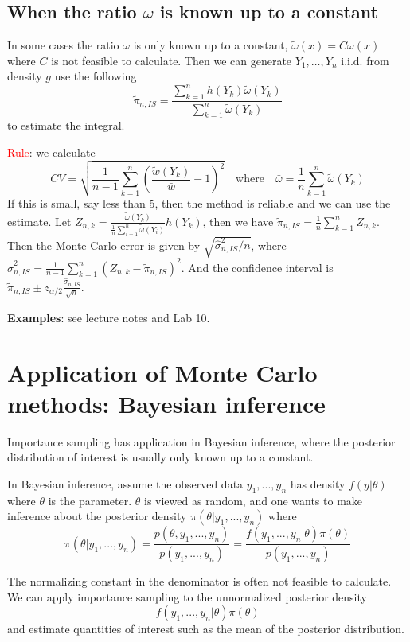 \documentclass[12pt]{article}
\begin{document}
\subsection*{When the ratio $\omega$ is known up to a constant}
In some cases the ratio $\omega$ is only known up to a constant, $\tilde{\omega}(x)=C\omega(x)$ where $C$ is not feasible to calculate. Then we can generate $Y_1,\ldots,Y_n$ i.i.d. from density $g$ use the following $$\tilde{\pi}_{n,IS}=\frac{\sum_{k=1}^n{h(Y_k)\tilde{\omega}(Y_k)}}{\sum_{k=1}^n{\tilde{\omega}(Y_k)}}$$ to estimate the integral.

\vspace{0.5cm}

\textcolor{red}{Rule}: we calculate $$ CV = \sqrt{\frac{1}{n-1} \sum_{k=1}^n \left(\frac{\tilde{w}(Y_k)}{\bar{w} } -1\right)^2}  \quad \mathrm{where}\quad \bar{\omega} = \frac{1}{n}\sum\limits_{k=1}^n\tilde{\omega}(Y_k)$$ If this is small, say less than 5, then the method is reliable and we can use the estimate. Let $Z_{n,k} = \frac{\tilde\omega(Y_k)}{\frac{1}{n}\sum_{i=1}^{n}\tilde\omega(Y_i)}h(Y_k)$, then we have $\tilde{\pi}_{n,IS}=\frac{1}{n}\sum_{k=1}^{n}Z_{n,k}$. Then the Monte Carlo error is given by $\sqrt{\hat{\sigma}^2_{n,IS}/n}$, where $\hat{\sigma}^2_{n,IS} = \frac{1}{n-1}\sum_{k=1}^n(Z_{n,k}-\tilde\pi_{n,IS})^2$. And the confidence interval is $\tilde{\pi}_{n,IS} \pm z_{\alpha/2}\frac{\hat{\sigma}_{n,IS}}{\sqrt{n}}$.

\vspace{0.5cm}
\textbf{Examples}: see lecture notes and Lab 10.

\section{Application of Monte Carlo methods: Bayesian inference}
Importance sampling has application in Bayesian inference, where the posterior distribution of interest is usually only known up to a constant. 

In Bayesian inference, assume the observed data $y_1, ..., y_n$ has density $f(y|\theta)$ where $\theta$ is the parameter. $\theta$ is viewed as random, and one wants to make inference about the posterior density $\pi(\theta|y_1, ..., y_n)$ where
$$
\pi(\theta|y_1, ..., y_n) = \frac{p(\theta, y_1, ..., y_n)}{p(y_1, ..., y_n)} = \frac{f(y_1, ..., y_n|\theta)\pi(\theta)}{p(y_1, ..., y_n)}
$$

The normalizing constant in the denominator is often not feasible to calculate. We can apply importance sampling to the unnormalized posterior density
$$f(y_1, ..., y_n|\theta)\pi(\theta)$$ and estimate quantities of interest such as the mean of the posterior distribution. 
\end{document}
